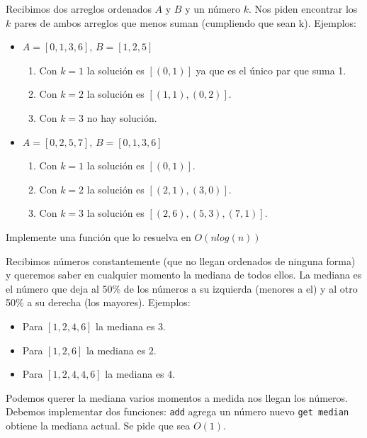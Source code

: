 \documentclass[titlepage,oneside]{book}
\begin{document}
\begin{Exercise}
    Recibimos dos arreglos ordenados $A$ y $B$ y un número $k$. Nos piden encontrar los $k$ pares de ambos arreglos que menos suman (cumpliendo que sean k). Ejemplos:
    \begin{itemize}
      \item $A = [0, 1, 3, 6]$, $B = [1, 2, 5]$
      \begin{enumerate}
        \item Con $k=1$ la solución es $[(0, 1)]$ ya que es el único par que suma 1.
        \item Con $k=2$ la solución es $[(1, 1), (0, 2)]$.
        \item Con $k=3$ no hay solución.
      \end{enumerate}
      \item $A = [0, 2, 5, 7]$, $B = [0, 1, 3, 6]$
      \begin{enumerate}
        \item Con $k=1$ la solución es $[(0, 1)]$.
        \item Con $k=2$ la solución es $[(2, 1), (3, 0)]$.
        \item Con $k=3$ la solución es $[(2, 6), (5, 3), (7, 1)]$.
      \end{enumerate}
    \end{itemize}
    Implemente una función que lo resuelva en $O(n log(n))$
\end{Exercise}

\begin{Exercise}
Recibimos números constantemente (que no llegan ordenados de ninguna forma) y queremos saber en cualquier momento la mediana de todos ellos. La mediana es el número que deja al 50\% de los números a su izquierda (menores a el) y al otro 50\% a su derecha (los mayores).
Ejemplos:
\begin{itemize}
    \item Para $[1,2,4,6]$ la mediana es $3$.
    \item Para $[1,2,6]$ la mediana es $2$.
    \item Para $[1,2,4,4,6]$ la mediana es $4$.
\end{itemize}

Podemos querer la mediana varios momentos a medida nos llegan los números. Debemos implementar dos funciones:
    \Question \texttt{add} agrega un número nuevo
    \Question \texttt{get median} obtiene la mediana actual. Se pide que sea $O(1)$.
\end{Exercise}
\end{document}
